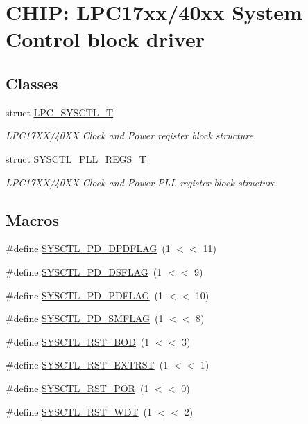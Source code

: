 \hypertarget{group__SYSCTL__17XX__40XX}{}\section{C\+H\+IP\+: L\+P\+C17xx/40xx System Control block driver}
\label{group__SYSCTL__17XX__40XX}
\subsection*{Classes}
\begin{DoxyCompactItemize}
\item 
struct \hyperlink{structLPC__SYSCTL__T}{L\+P\+C\+\_\+\+S\+Y\+S\+C\+T\+L\+\_\+T}
\begin{DoxyCompactList}\small\item\em L\+P\+C17\+X\+X/40\+XX Clock and Power register block structure. \end{DoxyCompactList}\item 
struct \hyperlink{structSYSCTL__PLL__REGS__T}{S\+Y\+S\+C\+T\+L\+\_\+\+P\+L\+L\+\_\+\+R\+E\+G\+S\+\_\+T}
\begin{DoxyCompactList}\small\item\em L\+P\+C17\+X\+X/40\+XX Clock and Power P\+LL register block structure. \end{DoxyCompactList}\end{DoxyCompactItemize}
\subsection*{Macros}
\begin{DoxyCompactItemize}
\item 
\#define \hyperlink{group__SYSCTL__17XX__40XX_ga6b2596afa60ba5439b3bb53e88df3e62}{S\+Y\+S\+C\+T\+L\+\_\+\+P\+D\+\_\+\+D\+P\+D\+F\+L\+AG}~(1 $<$$<$ 11)
\item 
\#define \hyperlink{group__SYSCTL__17XX__40XX_ga25e12d7c7721dd11b00c5a7a8ec51457}{S\+Y\+S\+C\+T\+L\+\_\+\+P\+D\+\_\+\+D\+S\+F\+L\+AG}~(1 $<$$<$ 9)
\item 
\#define \hyperlink{group__SYSCTL__17XX__40XX_ga64388699b0fcd5317d80927e6c8a1db9}{S\+Y\+S\+C\+T\+L\+\_\+\+P\+D\+\_\+\+P\+D\+F\+L\+AG}~(1 $<$$<$ 10)
\item 
\#define \hyperlink{group__SYSCTL__17XX__40XX_gab8cdb571c0a7cd9485523882eb033f79}{S\+Y\+S\+C\+T\+L\+\_\+\+P\+D\+\_\+\+S\+M\+F\+L\+AG}~(1 $<$$<$ 8)
\item 
\#define \hyperlink{group__SYSCTL__17XX__40XX_gab1441ee02763d5fa7073bcf026036784}{S\+Y\+S\+C\+T\+L\+\_\+\+R\+S\+T\+\_\+\+B\+OD}~(1 $<$$<$ 3)
\item 
\#define \hyperlink{group__SYSCTL__17XX__40XX_ga7e481a088f2ff36fc65b77dbb25a749a}{S\+Y\+S\+C\+T\+L\+\_\+\+R\+S\+T\+\_\+\+E\+X\+T\+R\+ST}~(1 $<$$<$ 1)
\item 
\#define \hyperlink{group__SYSCTL__17XX__40XX_gaeb159c3928c725d8e218dbb5426f99b8}{S\+Y\+S\+C\+T\+L\+\_\+\+R\+S\+T\+\_\+\+P\+OR}~(1 $<$$<$ 0)
\item 
\#define \hyperlink{group__SYSCTL__17XX__40XX_ga84b4a0f567758052c1f4097d51aaa1ae}{S\+Y\+S\+C\+T\+L\+\_\+\+R\+S\+T\+\_\+\+W\+DT}~(1 $<$$<$ 2)
\end{DoxyCompactItemize}
